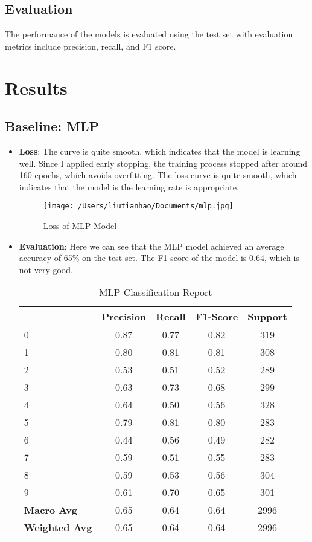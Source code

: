 \documentclass{article}
\begin{document}
\subsection{Evaluation}
The performance of the models is evaluated using the test set with evaluation metrics include precision, recall, and F1 score.


\section{Results}

\subsection{Baseline: MLP}
\begin{itemize}
  \item \textbf{Loss}: 
  The curve is quite smooth, which indicates that the model is learning well.
  Since I applied early stopping, the training process stopped after around 160 epochs, which avoids overfitting.
  The loss curve is quite smooth, which indicates that the model is the learning rate is appropriate.
  \begin{figure}[h]
    \centering
    \texttt{[image: /Users/liutianhao/Documents/mlp.jpg]}
    \caption{Loss of MLP Model}
  \end{figure}
  \item \textbf{Evaluation}:
  Here we can see that the MLP model achieved an average accuracy of 65\% on the test set.
  The F1 score of the model is 0.64, which is not very good.
  \begin{table}[h]
    \centering
    \caption{MLP Classification Report}
    \begin{tabular}{lcccc}
        \toprule
        & Precision & Recall & F1-Score & Support \\
        \midrule
        0 & 0.87 & 0.77 & 0.82 & 319 \\
        1 & 0.80 & 0.81 & 0.81 & 308 \\
        2 & 0.53 & 0.51 & 0.52 & 289 \\
        3 & 0.63 & 0.73 & 0.68 & 299 \\
        4 & 0.64 & 0.50 & 0.56 & 328 \\
        5 & 0.79 & 0.81 & 0.80 & 283 \\
        6 & 0.44 & 0.56 & 0.49 & 282 \\
        7 & 0.59 & 0.51 & 0.55 & 283 \\
        8 & 0.59 & 0.53 & 0.56 & 304 \\
        9 & 0.61 & 0.70 & 0.65 & 301 \\
        \midrule
        \textbf{Macro Avg} & 0.65 & 0.64 & 0.64 & 2996 \\
        \textbf{Weighted Avg} & 0.65 & 0.64 & 0.64 & 2996 \\
        \bottomrule
    \end{tabular}
  \end{table}
  
  
\end{itemize}
\end{document}

